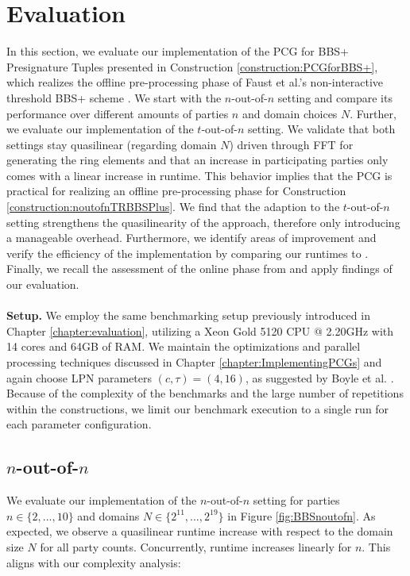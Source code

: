 \section{Evaluation}
\label{sec:evalBBSPlusPCG}
In this section, we evaluate our implementation of the PCG for BBS+ Presignature Tuples presented in Construction \ref{construction:PCGforBBS+}, which realizes the offline pre-processing phase of Faust et al.'s non-interactive threshold BBS+ scheme \cite{faust2023non}. We start with the $n$-out-of-$n$ setting and compare its performance over different amounts of parties $n$ and domain choices $N$. Further, we evaluate our implementation of the $t$-out-of-$n$ setting. We validate that both settings stay quasilinear (regarding domain $N$) driven through FFT for generating the ring elements and that an increase in participating parties only comes with a linear increase in runtime. This behavior implies that the PCG is practical for realizing an offline pre-processing phase for Construction \ref{construction:noutofnTRBBSPlus}. We find that the adaption to the $t$-out-of-$n$ setting strengthens the quasilinearity of the approach, therefore only introducing a manageable overhead. Furthermore, we identify areas of improvement and verify the efficiency of the implementation by comparing our runtimes to \cite{abram2022low}. Finally, we recall the assessment of the online phase from \cite{faust2023non} and apply findings of our evaluation.
\\\\
\textbf{Setup.} We employ the same benchmarking setup previously introduced in Chapter \ref{chapter:evaluation}, utilizing a Xeon Gold 5120 CPU @ 2.20GHz with 14 cores and 64GB of RAM. We maintain the optimizations and parallel processing techniques discussed in Chapter \ref{chapter:ImplementingPCGs} and again choose LPN parameters $(c,\tau)=(4,16)$, as suggested by Boyle et al. \cite{boyle2020efficient}. Because of the complexity of the benchmarks and the large number of repetitions within the constructions, we limit our benchmark execution to a single run for each parameter configuration.

\subsection{$n$-out-of-$n$}
We evaluate our implementation of the $n$-out-of-$n$ setting for parties $n\in \{2, ..., 10\}$ and domains $N\in \{2^{11}, ...,2^{19}\}$ in Figure \ref{fig:BBSnoutofn}. As expected, we observe a quasilinear runtime increase with respect to the domain size $N$ for all party counts. Concurrently, runtime increases linearly for $n$. This aligns with our complexity analysis:

